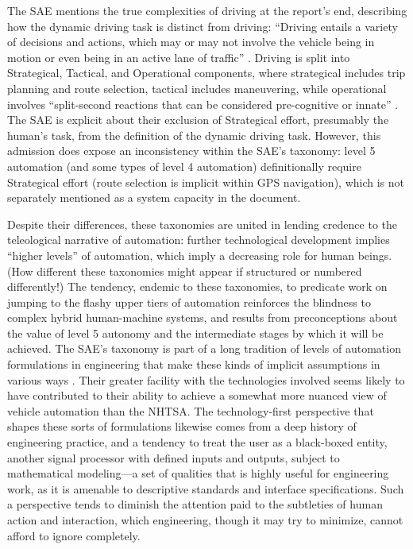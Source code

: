 The SAE mentions the true complexities of driving at the report's end,
describing how the dynamic driving task is distinct from driving:
``Driving entails a variety of decisions and actions, which may or may
not involve the vehicle being in motion or even being in an active
lane of traffic'' \cite[p. 12]{SAE}. Driving is split into Strategical, Tactical, and
Operational components, where strategical includes trip planning and
route selection, tactical includes maneuvering, while operational
involves ``split-second reactions that can be considered pre-cognitive
or innate'' \cite{Michon}. The SAE is explicit about their exclusion of Strategical
effort, presumably the human's task, from the definition of the
dynamic driving task. However, this admission does expose an
inconsistency within the SAE's taxonomy: level 5 automation (and some
types of level 4 automation) definitionally require Strategical effort
(route selection is implicit within GPS navigation), which is not
separately mentioned as a system capacity in the document.

Despite their differences, these taxonomies are united in lending
credence to the teleological narrative of automation:  further
technological development implies ``higher levels'' of automation, which
imply a decreasing role for human beings. (How different these
taxonomies might appear if structured or numbered differently!)
The tendency, endemic to these taxonomies, to predicate work on
jumping to the flashy upper tiers of automation reinforces the
blindness to complex hybrid human-machine systems, and results from
preconceptions about the value of level 5 autonomy and the
intermediate stages by which it will be achieved. The SAE's taxonomy
is part of a long tradition of levels of automation formulations in
engineering that make these kinds of implicit assumptions in various
ways \cite{parasuramanW} \cite{PSWickens} \cite{ALFUS} \cite{SMART}. Their
greater facility with the technologies involved seems likely to have
contributed to their ability to achieve a somewhat more nuanced view
of vehicle automation than the NHTSA. The
technology-first perspective that shapes these sorts of formulations
likewise comes from a deep history of engineering practice, and a
tendency to treat the user as a black-boxed entity, another signal
processor with defined inputs and outputs, subject to mathematical
modeling---a set of qualities that is highly useful for engineering
work, as it is amenable to descriptive standards and interface
specifications. Such a perspective tends to diminish the attention
paid to
the subtleties of human action and interaction, which engineering,
though it may try to minimize, cannot afford to ignore completely.

